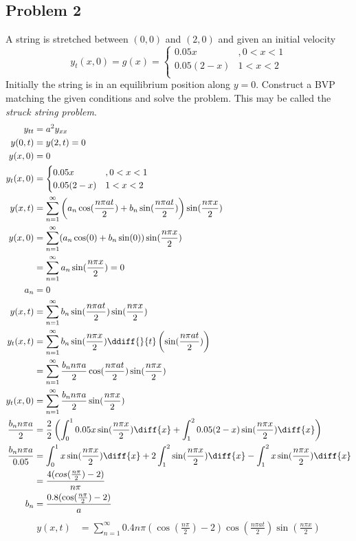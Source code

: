 \documentclass{math}
\begin{document}
\subsection*{Problem 2}
A string is stretched between \( (0,0) \) and \( (2,0) \) and given an initial
velocity
\[ y_t(x,0) = g(x) = \begin{cases}
  0.05x &, 0<x<1 \\
  0.05(2-x) & 1<x<2 \\
\end{cases} \]
Initially the string is in an equilibrium position along \( y = 0 \). Construct
a BVP matching the given conditions and solve the problem. This may be called
the \textit{struck string problem}.
\begin{align*}
  y_{tt} &= a^2y_{xx} \\
  y(0,t) &= y(2,t) = 0 \\
  y(x,0) &= 0 \\
  y_t(x,0) &= \begin{cases}
    0.05x &, 0<x<1 \\
    0.05(2-x) & 1<x<2 \\
  \end{cases} \\
  y(x,t) &= \sum_{n=1}^{\infty}\left(a_n\cos(\frac{n\pi at}{2})+
    b_n\sin(\frac{n\pi at}{2})\right)\sin(\frac{n\pi x}{2}) \\
  y(x,0) &= \sum_{n=1}^{\infty}(a_n\cos(0)+b_n\sin(0))\sin(\frac{n\pi x}{2}) \\
  &= \sum_{n=1}^{\infty}a_n\sin(\frac{n\pi x}{2}) = 0 \\
  a_n &= 0 \\
  y(x,t) &= \sum_{n=1}^{\infty}
    b_n\sin(\frac{n\pi at}{2})\sin(\frac{n\pi x}{2}) \\
  y_t(x,t) &= \sum_{n=1}^{\infty}b_n\sin(\frac{n\pi x}{2})
    \ddiff{}{t}\left(\sin(\frac{n\pi at}{2})\right) \\
  &= \sum_{n=1}^{\infty}\frac{b_nn\pi a}{2}\cos(\frac{n\pi at}{2})
    \sin(\frac{n\pi x}{2}) \\
  y_t(x,0) &= \sum_{n=1}^{\infty}\frac{b_nn\pi a}{2}\sin(\frac{n\pi x}{2}) \\
  \frac{b_nn\pi a}{2} &= \frac{2}{2}\left(
    \int_{0}^{1}0.05x\sin(\frac{n\pi x}{2})\diff{x}+
    \int_{1}^{2}0.05(2-x)\sin(\frac{n\pi x}{2})\diff{x}\right) \\
  \frac{b_nn\pi a}{0.05} &=
    \int_{0}^{1}x\sin(\frac{n\pi x}{2})\diff{x}+
    2\int_{1}^{2}\sin(\frac{n\pi x}{2})\diff{x}-
    \int_{1}^{2}x\sin(\frac{n\pi x}{2})\diff{x} \\
  &= \frac{4(cos(\frac{n\pi}{2})-2)}{n\pi} \\
  b_n &= \frac{0.8(\cos(\frac{n\pi}{2})-2)}{a} \\
\end{align*}
\begin{align*}
  y(x,t) &= \sum_{n=1}^{\infty}0.4n\pi (\cos(\frac{n\pi}{2})-2)
    \cos(\frac{n\pi at}{2})\sin(\frac{n\pi x}{2}) \\
\end{align*}
\end{document}
